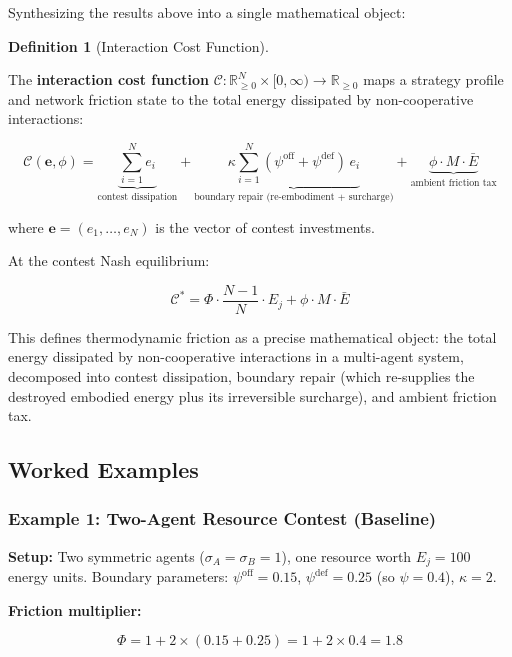 \documentclass[11pt]{article}
\theoremstyle{plain}
\theoremstyle{definition}
\newtheorem{definition}{Definition}
\theoremstyle{remark}
\let\origsubsection\subsection
\renewcommand{\subsection}{\needspace{7\baselineskip}\origsubsection}
\let\origsubsubsection\subsubsection
\renewcommand{\subsubsection}{\needspace{4\baselineskip}\origsubsubsection}
\begin{document}
Synthesizing the results above into a single mathematical object:

\begin{definition}[Interaction Cost Function]
\label{def-interaction-cost-function}

The \textbf{interaction cost function} $\mathcal{C} : \mathbb{R}_{\geq 0}^N \times [0, \infty) \to \mathbb{R}_{\geq 0}$ maps a strategy profile and network friction state to the total energy dissipated by non-cooperative interactions:

$$\mathcal{C}(\mathbf{e}, \phi) = \underbrace{\sum_{i=1}^{N} e_i}_{\text{contest dissipation}} + \underbrace{\kappa \sum_{i=1}^{N} (\psi^{\text{off}} + \psi^{\text{def}}) \, e_i}_{\text{boundary repair (re-embodiment + surcharge)}} + \underbrace{\phi \cdot M \cdot \bar{E}}_{\text{ambient friction tax}}$$

where $\mathbf{e} = (e_1, \ldots, e_N)$ is the vector of contest investments.

At the contest Nash equilibrium:

$$\mathcal{C}^* = \Phi \cdot \frac{N-1}{N} \cdot E_j + \phi \cdot M \cdot \bar{E}$$
\end{definition}

This defines thermodynamic friction as a precise mathematical object:
the total energy dissipated by non-cooperative interactions in a
multi-agent system, decomposed into contest dissipation, boundary repair
(which re-supplies the destroyed embodied energy plus its irreversible
surcharge), and ambient friction tax.

\subsection{Worked Examples}\label{worked-examples-2}

\subsubsection{Example 1: Two-Agent Resource Contest
(Baseline)}\label{example-1-two-agent-resource-contest-baseline}

\textbf{Setup:} Two symmetric agents (\(\sigma_A = \sigma_B = 1\)), one
resource worth \(E_j = 100\) energy units. Boundary parameters:
\(\psi^{\text{off}} = 0.15\), \(\psi^{\text{def}} = 0.25\) (so
\(\psi = 0.4\)), \(\kappa = 2\).

\textbf{Friction multiplier:}

\[\Phi = 1 + 2 \times (0.15 + 0.25) = 1 + 2 \times 0.4 = 1.8\]
\end{document}
